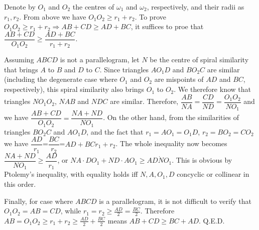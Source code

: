 \documentclass[11pt,a4paper]{article}
\begin{document}
Denote by $O_1$ and $O_2$ the centres of $\omega_1$ and $\omega_2$, respectively, and their radii as $r_1, r_2$. From above we have $O_1O_2\ge r_1+r_2$. To prove $O_1O_2\ge r_1+r_2\Rightarrow AB+CD\ge AD+BC$, it suffices to proe that $\dfrac{AB+CD}{O_1O_2}\ge\dfrac{AD+BC}{r_1+r_2}$.

Assuming $ABCD$ is not a parallelogram, let $N$ be the centre of spiral similarity that brings $A$ to $B$ and $D$ to $C$. Since triangles $AO_1D$ and $BO_2C$ are similar (including the degenerate case where $O_1$ and $O_2$ are mispoints of $AD$ and $BC$, respectively), this spiral similarity also brings $O_1$ to $O_2$. We therefore know that triangles $NO_1O_2$, $NAB$ and $NDC$ are similar. Therefore, $\dfrac{AB}{NA}=\dfrac{CD}{ND}=\dfrac{O_1O_2}{NO_1}$ and we have $\dfrac{AB+CD}{O_1O_2}=\dfrac{NA+ND}{NO_1}$. On the other hand, from the similarities of triangles $BO_2C$ and $AO_1D$, and the fact that $r_1=AO_1=O_1D$, $r_2=BO_2=CO_2$ we have $\dfrac{AD}{r_1}$=$\dfrac{BC}{r_2}$=${AD+BC}{r_1+r_2}$. The whole inequality now becomes $\dfrac{NA+ND}{NO_1}\ge \dfrac{AD}{r_1}$, or $NA\cdot DO_1+ND\cdot AO_1\ge AD\dot NO_1$. This is  obvious by Ptolemy's inequality, with equality holds iff $N,A,O_1,D$ concyclic or collinear in this order.

Finally, for case where $ABCD$ is a parallelogram, it is not difficult to verify that $O_1O_2=AB=CD$, while $r_1=r_2\ge \frac{AD}{2}=\frac{BC}{2}$. Therefore $AB=O_1O_2\ge r_1+r_2\ge\frac{AD}{2}+\frac{BC}{2}$ means $AB+CD\ge BC+AD$. Q.E.D.
\end{document}

